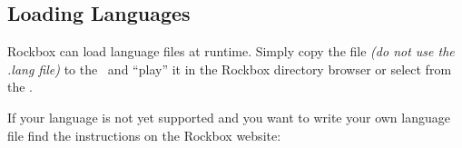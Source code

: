 \subsection{\label{ref:Loadinglanguages}Loading Languages}
%
Rockbox can load language files at runtime. Simply copy the  file
\emph{(do not use the .lang file)} to the \dap\ and ``play'' it in the
Rockbox directory browser or select from the .\\


If your language is not yet supported and you want to write your own language
file find the instructions on the Rockbox website:

